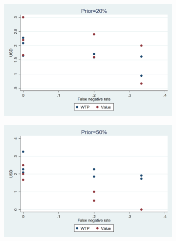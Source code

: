\documentclass[11pt,a4paper]{article}
\begin{document}
\begin{figure}[!h]
\begin{subfigure}[t]{0.5\textwidth}
  \centering
  \includegraphics[width=.95\linewidth]{Graphs/hist_WTP_FN_coll2.png}
\end{subfigure}%
\begin{subfigure}[t]{0.5\textwidth}
  \centering
  \includegraphics[width=.95\linewidth]{Graphs/hist_WTP_FN_coll5.png}

\end{subfigure}

\end{figure}
\end{document}
